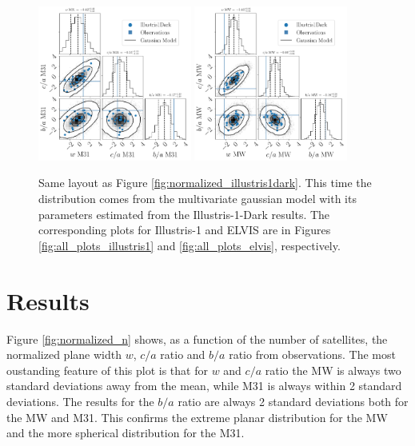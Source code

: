 \documentclass[a4paper,fleqn,usenatbib]{mnras}
\begin{document}
\begin{figure}
\centering
\includegraphics[width=0.45\textwidth]{gaussian_model_illustris1dark_M31_n_11.pdf}
\includegraphics[width=0.45\textwidth]{gaussian_model_illustris1dark_MW_n_11.pdf}
\caption{
Same layout as Figure \ref{fig:normalized_illustris1dark}. 
This time the distribution comes from the multivariate gaussian model 
with its parameters estimated from the Illustris-1-Dark results.
The corresponding plots for Illustris-1 and ELVIS are
in Figures \ref{fig:all_plots_illustris1} and \ref{fig:all_plots_elvis},
respectively. \label{fig:gaussian_illustris1dark}}     
\end{figure}


\section{Results}
\label{sec:results}

Figure \ref{fig:normalized_n} shows, as a function of the number of
satellites, the normalized plane width $w$, $c/a$ ratio and
$b/a$ ratio from observations. 
The most oustanding feature of this plot is that for $w$ and $c/a$
ratio the MW is always two standard deviations away from the mean,
while M31 is always within 2 standard deviations.
The results for the $b/a$ ratio are always 2 standard deviations both
for the MW and M31. 
This confirms the extreme planar distribution for the MW and the more
spherical distribution for the M31.
\end{document}
